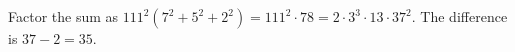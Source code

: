Factor the sum as $111^2(7^2+5^2+2^2)=111^2\cdot78=2\cdot3^3\cdot13\cdot37^2$. The difference is $37-2=\boxed{35}$.
